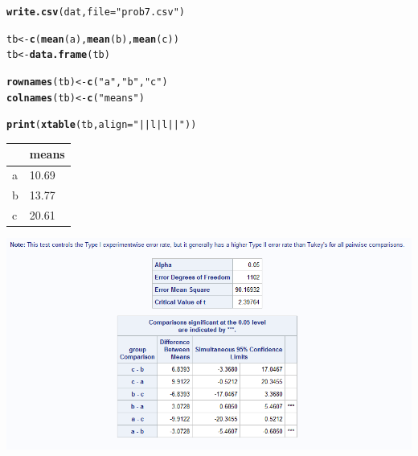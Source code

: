 \documentclass{article}\usepackage[]{graphicx}\usepackage[]{color}
\makeatletter
\newcommand{\hlstr}[1]{\textcolor[rgb]{0.192,0.494,0.8}{#1}}%
\newcommand{\hlstd}[1]{\textcolor[rgb]{0.345,0.345,0.345}{#1}}%
\newcommand{\hlkwb}[1]{\textcolor[rgb]{0.69,0.353,0.396}{#1}}%
\newcommand{\hlkwc}[1]{\textcolor[rgb]{0.333,0.667,0.333}{#1}}%
\newcommand{\hlkwd}[1]{\textcolor[rgb]{0.737,0.353,0.396}{\textbf{#1}}}%
\newenvironment{kframe}{%
 \def\at@end@of@kframe{}%
 \ifinner\ifhmode%
  \def\at@end@of@kframe{\end{minipage}}%
  \begin{minipage}{\columnwidth}%
 \fi\fi%
 \def\FrameCommand##1{\hskip\@totalleftmargin \hskip-\fboxsep
 \colorbox{shadecolor}{##1}\hskip-\fboxsep
     \hskip-\linewidth \hskip-\@totalleftmargin \hskip\columnwidth}%
 \MakeFramed {\advance\hsize-\width
   \@totalleftmargin\z@ \linewidth\hsize
   \@setminipage}}%
 {\par\unskip\endMakeFramed%
 \at@end@of@kframe}
\makeatother
\begin{document}
\begin{enumerate}
\begin{kframe}
\begin{alltt}
\hlkwd{write.csv}\hlstd{(dat,} \hlkwc{file} \hlstd{=} \hlstr{"prob7.csv"}\hlstd{)}

\hlstd{tb} \hlkwb{<-} \hlkwd{c}\hlstd{(}\hlkwd{mean}\hlstd{(a),} \hlkwd{mean}\hlstd{(b),} \hlkwd{mean}\hlstd{(c))}
\hlstd{tb} \hlkwb{<-} \hlkwd{data.frame}\hlstd{(tb)}

\hlkwd{rownames}\hlstd{(tb)} \hlkwb{<-} \hlkwd{c}\hlstd{(}\hlstr{"a"}\hlstd{,} \hlstr{"b"}\hlstd{,} \hlstr{"c"}\hlstd{)}
\hlkwd{colnames}\hlstd{(tb)} \hlkwb{<-} \hlkwd{c}\hlstd{(}\hlstr{"means"}\hlstd{)}

\hlkwd{print}\hlstd{(}\hlkwd{xtable}\hlstd{(tb,} \hlkwc{align} \hlstd{=} \hlstr{"||l|l||"}\hlstd{))}
\end{alltt}
\end{kframe}%
\begin{table}[ht]
\centering
\begin{tabular}{||l|l||}
  \hline
 & means \\ 
  \hline
a & 10.69 \\ 
  b & 13.77 \\ 
  c & 20.61 \\ 
   \hline
\end{tabular}
\end{table}




\includegraphics[scale=0.5]{prob7}



\end{enumerate}
\end{document}
